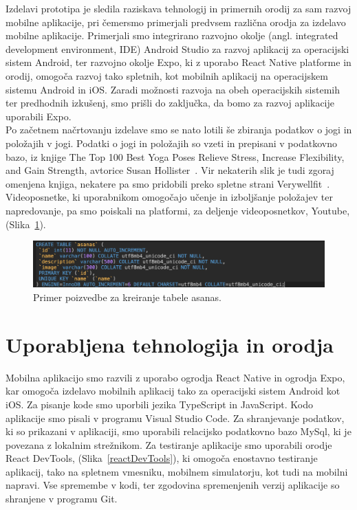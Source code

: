 \documentclass[a4paper, 12pt]{book}
\begin{document}
Izdelavi prototipa je sledila raziskava tehnologij in primernih orodij za sam razvoj mobilne aplikacije, pri čemersmo primerjali predvsem različna orodja za izdelavo mobilne aplikacije. Primerjali smo integrirano razvojno okolje (angl. integrated development environment, IDE) Android Studio za razvoj aplikacij za operacijski sistem Android, ter razvojno okolje Expo, ki z uporabo React Native platforme in orodij, omogoča razvoj tako spletnih, kot mobilnih aplikacij na operacijskem sistemu Android in iOS. Zaradi možnosti razvoja na obeh operacijskih sistemih ter predhodnih izkušenj, smo prišli do zaključka, da bomo za razvoj aplikacije uporabili Expo.\\

Po začetnem načrtovanju izdelave smo se nato lotili še zbiranja podatkov o jogi in položajih v jogi. Podatki o jogi in položajih so vzeti in prepisani v podatkovno bazo, iz knjige The Top 100 Best Yoga Poses Relieve Stress, Increase Flexibility, and Gain Strength, avtorice Susan Hollister~\cite{yoga}. Vir nekaterih slik je tudi zgoraj omenjena knjiga, nekatere pa smo pridobili preko spletne strani Verywellfit~\cite{verywellfit}. Videoposnetke, ki uporabnikom omogočajo učenje in izboljšanje položajev ter napredovanje, pa smo poiskali na platformi, za deljenje videoposnetkov, Youtube, (Slika~\ref{query}).

\begin{figure}[htbp]
\begin{center}
\includegraphics[scale=.55]{query.jpg}
\end{center}
\caption{Primer poizvedbe za kreiranje tabele asanas.}
\label{query}
\end{figure}

\chapter{Uporabljena tehnologija in orodja}
\label{ch2}
Mobilna aplikacijo smo razvili z uporabo ogrodja React Native in ogrodja Expo, kar omogoča izdelavo mobilnih aplikacij tako za operacijski sistem Android kot iOS. Za pisanje kode smo uporbili jezika TypeScript in JavaScript. Kodo aplikacije smo pisali v programu Visual Studio Code. Za shranjevanje podatkov, ki so prikazani v aplikaciji, smo uporabili relacijsko podatkovno bazo MySql, ki je povezana z lokalnim strežnikom. 
Za testiranje aplikacije smo uporabili orodje React DevTools, (Slika~\ref{reactDevTools}), ki omogoča enostavno testiranje aplikacij, tako na spletnem vmesniku, mobilnem simulatorju, kot tudi na mobilni napravi. Vse spremembe v kodi, ter zgodovina spremenjenih verzij aplikacije so shranjene v programu Git.
\end{document}
